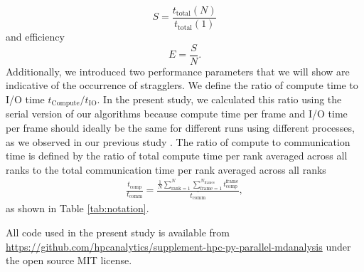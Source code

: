 \begin{equation}
  \label{eq:speedup}
  S = \frac{t_{\text{total}}(N)}{t_{\text{total}}(1)}
\end{equation}
and efficiency
\begin{equation}
  \label{eq:efficiency}
  E = \frac{S}{N}.
\end{equation}
Additionally, we introduced two performance parameters that we will show are indicative of the occurrence of stragglers.
We define the ratio of compute time to I/O time $t_{\text{Compute}}/t_{\text{IO}}$. 
In the present study, we calculated this ratio using the serial version of our algorithms because compute time per frame and I/O time per frame should ideally be the same for different runs using different processes, as we observed in our previous study \cite{Khoshlessan:2017ab}.
The ratio of compute to communication time is defined by the ratio of total compute time per rank averaged across all ranks to the total communication time per rank averaged across all ranks 
\begin{gather}
  \label{eq:Compute-comm}
  \frac{t_{\text{comp}}}{t_{\text{comm}}} = \frac{\frac{1}{N}
    \sum_{\text{rank}=1}^{N} \sum_{\text{frame}=1}^{N_{\text{frames}}}t_{\text{comp}}^{\text{frame}}}%
  {\overline{t_{\text{comm}}}},
\end{gather}
as shown in Table \ref{tab:notation}.
 
All code used in the present study is available from \url{https://github.com/hpcanalytics/supplement-hpc-py-parallel-mdanalysis} under the open source MIT license. 
 
